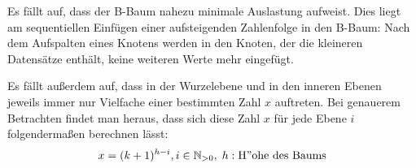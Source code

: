 \begin{enumerate}[a)]
\begin{solution}
\begin{center}
\end{center}

Es fällt auf, dass der B-Baum nahezu minimale Auslastung aufweist. Dies liegt am sequentiellen Einfügen einer aufsteigenden Zahlenfolge in den B-Baum: Nach dem Aufspalten eines Knotens werden in den Knoten, der die kleineren Datensätze enthält, keine weiteren Werte mehr eingefügt.

Es fällt außerdem auf, dass in der Wurzelebene und in den inneren Ebenen jeweils immer nur Vielfache einer bestimmten Zahl $x$ auftreten. Bei genauerem Betrachten findet man heraus, dass sich diese Zahl $x$ für jede Ebene $i$ folgendermaßen berechnen lässt:
\[x = (k + 1)^{h - i}, i \in \mathbb{N}_{>0},\; h: \mathrm{H"ohe\ des\ Baums}\]


\end{solution}
\end{enumerate}

